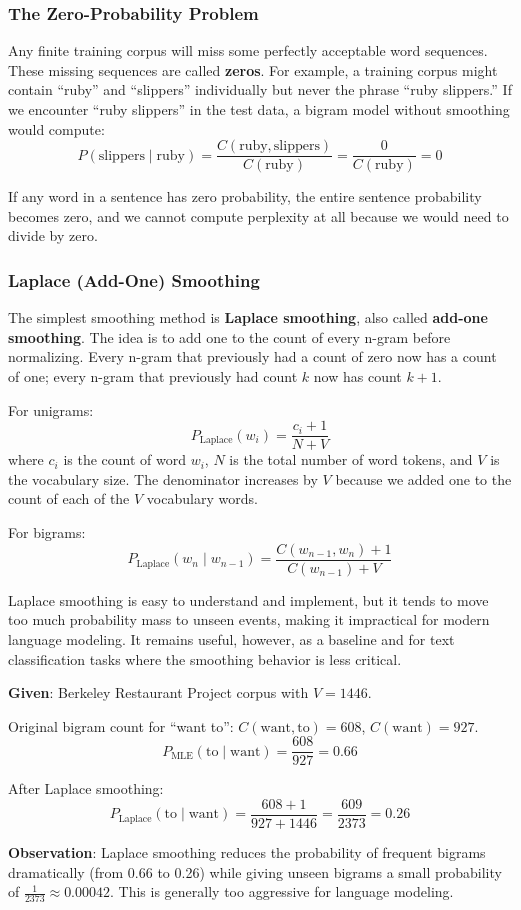 \documentclass[11pt,a4paper]{article}
\begin{document}
\subsubsection{The Zero-Probability Problem}

Any finite training corpus will miss some perfectly acceptable word sequences. These missing sequences are called \textbf{zeros}. For example, a training corpus might contain ``ruby'' and ``slippers'' individually but never the phrase ``ruby slippers.'' If we encounter ``ruby slippers'' in the test data, a bigram model without smoothing would compute:
\[
P(\text{slippers} \mid \text{ruby}) = \frac{C(\text{ruby}, \text{slippers})}{C(\text{ruby})} = \frac{0}{C(\text{ruby})} = 0
\]

If any word in a sentence has zero probability, the entire sentence probability becomes zero, and we cannot compute perplexity at all because we would need to divide by zero.

\subsubsection{Laplace (Add-One) Smoothing}

The simplest smoothing method is \textbf{Laplace smoothing}, also called \textbf{add-one smoothing}. The idea is to add one to the count of every n-gram before normalizing. Every n-gram that previously had a count of zero now has a count of one; every n-gram that previously had count $k$ now has count $k+1$.

For unigrams:
\[
P_{\text{Laplace}}(w_i) = \frac{c_i + 1}{N + V}
\]
where $c_i$ is the count of word $w_i$, $N$ is the total number of word tokens, and $V$ is the vocabulary size. The denominator increases by $V$ because we added one to the count of each of the $V$ vocabulary words.

For bigrams:
\[
P_{\text{Laplace}}(w_n \mid w_{n-1}) = \frac{C(w_{n-1}, w_n) + 1}{C(w_{n-1}) + V}
\]

Laplace smoothing is easy to understand and implement, but it tends to move too much probability mass to unseen events, making it impractical for modern language modeling. It remains useful, however, as a baseline and for text classification tasks where the smoothing behavior is less critical.

\begin{tcolorbox}[colback=green!5!white,colframe=green!75!black,title=\textbf{Numerical: Laplace Smoothing Example}]
\textbf{Given}: Berkeley Restaurant Project corpus with $V = 1446$.

Original bigram count for ``want to'': $C(\text{want}, \text{to}) = 608$, $C(\text{want}) = 927$.
\[
P_{\text{MLE}}(\text{to} \mid \text{want}) = \frac{608}{927} = 0.66
\]

After Laplace smoothing:
\[
P_{\text{Laplace}}(\text{to} \mid \text{want}) = \frac{608 + 1}{927 + 1446} = \frac{609}{2373} = 0.26
\]

\textbf{Observation}: Laplace smoothing reduces the probability of frequent bigrams dramatically (from 0.66 to 0.26) while giving unseen bigrams a small probability of $\frac{1}{2373} \approx 0.00042$. This is generally too aggressive for language modeling.
\end{tcolorbox}
\end{document}
